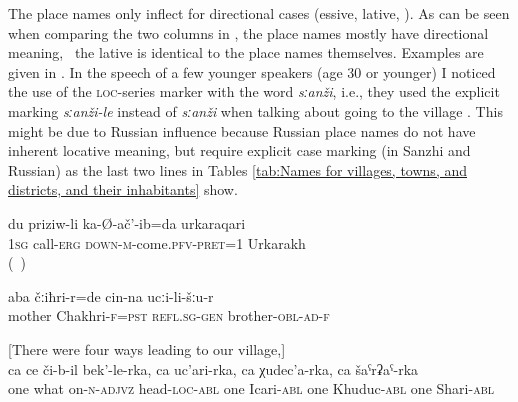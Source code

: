 The place names only inflect for directional cases (essive, lative, ). As can be seen when comparing the two columns in , the place names mostly have directional meaning, \tie\ the lative is identical to the place names themselves. Examples are given in . In the speech of a few younger speakers (age 30 or younger) I noticed the use of the  \textsc{loc}-series marker with the word \textit{sːanži}, i.e., they used the explicit marking \textit{sːanži-le} instead of \textit{sːanži} when talking about going to the village . This might be due to Russian influence because Russian place names do not have inherent locative meaning, but require explicit case marking (in Sanzhi and Russian) as the last two lines in Tables \ref{tab:Names for villages, towns, and districts, and their inhabitants} show.

%
\begin{exe}
	\ex	\label{ex:I came to Urkarakh by call}
	\gll   	du	priziw-li	ka-Ø-ač'-ib=da	urkaraqari\\
		\textsc{1sg}	call-\textsc{erg}	\textsc{down-m}-come.\textsc{pfv-pret}=1	Urkarakh\\
	\glt 	 {} (\tie\ )

	\ex	\label{ex:My mother was in Chakhri, at her brother's place}
	\gll  	aba	čːiħri-r=de	cin-na	ucːi-li-šːu-r\\
		mother	Chakhri-\textsc{f=pst}		\textsc{refl.sg-gen}	brother-\textsc{obl-ad-f}\\
	\glt	{}

	\ex	\label{ex:one through the peak on which there is}[There were four ways leading to our village,]\\
	\gll  	ca	ce	či-b-il	bek'-le-rka,	ca	uc'ari-rka,	ca	χudec'a-rka,		ca	šaˁrʡaˁ-rka\\
		one	what	on-\textsc{n-adjvz}	head-\textsc{loc-abl}	one	Icari-\textsc{abl}	one	Khuduc-\textsc{abl}	one	Shari-\textsc{abl}\\
	\glt  	{}
\end{exe}

